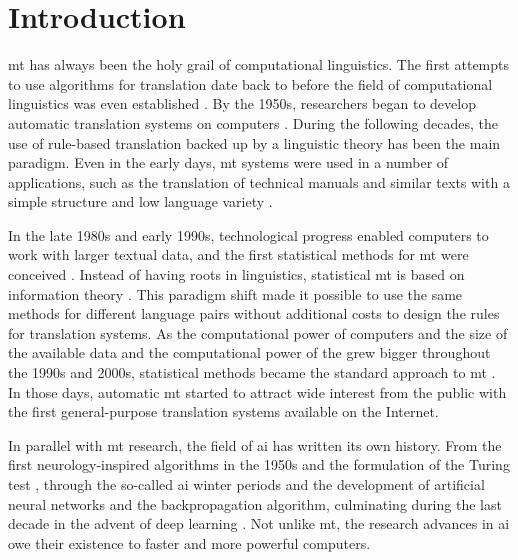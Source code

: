 \chapter{Introduction}%
\label{chap:intro}

\Ac{mt} has always been the holy grail of computational linguistics. The first
attempts to use algorithms for translation date back to before the field of
computational linguistics was even established
\citep{dupont2017cryptological}. By the 1950s, researchers began to develop
automatic translation systems on computers
\citep{dostert1955georgetown}. During the following decades, the use of
rule-based translation backed up by a linguistic theory has been the main
paradigm. Even in the early days, \ac{mt} systems were used in a number of
applications, such as the translation of technical manuals and similar texts
with a simple structure and low language variety \citep{slocum-1985-survey}.

In the late 1980s and early 1990s, technological progress enabled computers to
work with larger textual data, and the first statistical methods for \ac{mt}
were conceived \citep{nagao1984framework, brown-etal-1990-statistical}. Instead
of having roots in linguistics, statistical \ac{mt} is based on information
theory \citep{shannon1948mathematical}. This paradigm shift made it possible to
use the same methods for different language pairs without additional costs to
design the rules for translation systems. As the computational power of
computers and the size of the available data and the computational power of the
grew bigger throughout the 1990s and 2000s, statistical methods became the
standard approach to \ac{mt} \citep{koehn2009statistical}. In those days,
automatic \ac{mt} started to attract wide interest from the public with the
first general-purpose translation systems available on the Internet.

In parallel with \ac{mt} research, the field of \ac{ai} has written its own
history. From the first neurology-inspired algorithms in the 1950s and the
formulation of the Turing test \citep{turing1950computing}, through the
so-called \ac{ai} winter periods and the development of artificial neural
networks and the backpropagation algorithm, culminating during the last decade
in the advent of deep learning \citep{goodfellow2016deep}.  Not unlike \ac{mt},
the research advances in \ac{ai} owe their existence to faster and more
powerful computers.


